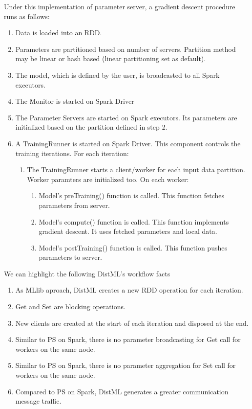 Under this implementation of parameter server, a gradient descent procedure runs as follows:
\begin{enumerate}
  \item Data is loaded into an RDD.
  \item Parameters are partitioned based on number of servers. Partition method may be linear or hash based (linear partitioning set as default).
  \item The model, which is defined by the user, is broadcasted to all Spark executors.
  \item The Monitor is started on Spark Driver
  \item The Parameter Servers are started on Spark executors. Its parameters are initialized based on the partition defined in step 2.
  \item A TrainingRunner is started on Spark Driver. This component controls the training iterations. For each iteration:
  \begin{enumerate}[label*=\arabic*.]
    \item The TrainingRunner starts a client/worker for each input data partition. Worker paramters are initialized too. On each worker:
    \begin{enumerate}[label*=\arabic*.]
      \item Model's preTraining() function is called. This function fetches parameters from server.
      \item Model's compute() function is called. This function implements gradient descent. It uses fetched parameters and local data.
      \item Model's postTraining() function is called. This function pushes parameters to server.
    \end{enumerate}  
  \end{enumerate}  
\end{enumerate}

We can highlight the following DistML's workflow facts
\begin{enumerate}
  \item As MLlib aproach, DistML creates a new RDD operation for each iteration.
  \item Get and Set are blocking operations.
  \item New clients are created at the start of each iteration and disposed at the end.  
  \item Similar to PS on Spark, there is no parameter broadcasting for Get call for workers on the same node.
  \item Similar to PS on Spark, there is no parameter aggregation for Set call for workers on the same node.
  \item Compared to PS on Spark, DistML generates a greater communication message traffic.
\end{enumerate}

